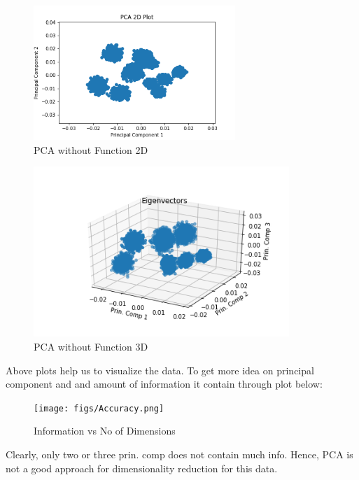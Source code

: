 \documentclass[journal,12pt,twocolumn]{IEEEtran}
\begin{document}
\begin{figure}[!h]
\begin{center}
\includegraphics[width=3in]{figs/PCA_2D_woFun.png}
\end{center}
\caption{PCA without Function 2D}
\label{fig: 2D Plot}
\end{figure}

\begin{figure}[!h]
\begin{center}
\includegraphics[width=3.8in]{figs/PCA_3D_woFun.png}
\end{center}
\caption{PCA without Function 3D}
\label{fig: 3D Plot}
\end{figure}

Above plots help us to visualize the data. To get more idea on principal component and and amount of information it contain through plot below:

\begin{figure}[!h]
\begin{center}
\texttt{[image: figs/Accuracy.png]}
\end{center}
\caption{Information vs No of Dimensions }
\label{fig: }
\end{figure}  

Clearly, only two or three prin. comp does not contain much info. Hence, PCA is not a good approach for dimensionality reduction for this data.
\end{document}
